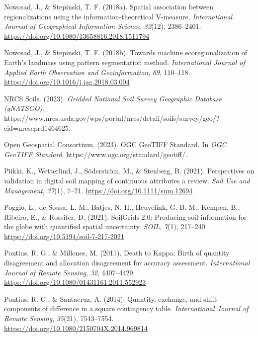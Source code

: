 \documentclass[
  letterpaper,
  DIV=11,
  numbers=noendperiod]{scrartcl}
\newlength{\cslhangindent}
\newlength{\cslentryspacingunit} %
\newenvironment{CSLReferences}[2] %
 {%
  \setlength{\parindent}{0pt}
  \ifodd #1
  \let\oldpar\par
  \def\par{\hangindent=\cslhangindent\oldpar}
  \fi
  \setlength{\parskip}{#2\cslentryspacingunit}
 }%
 {}
\begin{document}
\begin{CSLReferences}{1}{0}
\leavevmode{}%
Nowosad, J., \& Stepinski, T. F. (2018a). Spatial association between
regionalizations using the information-theoretical {V-measure}.
\emph{International Journal of Geographical Information Science},
\emph{32}(12), 2386--2401.
\url{https://doi.org/10.1080/13658816.2018.1511794}

\leavevmode{}%
Nowosad, J., \& Stepinski, T. F. (2018b). Towards machine
ecoregionalization of {Earth}'s landmass using pattern segmentation
method. \emph{International Journal of Applied Earth Observation and
Geoinformation}, \emph{69}, 110--118.
\url{https://doi.org/10.1016/j.jag.2018.03.004}

\leavevmode{}%
NRCS Soils. (2023). \emph{Gridded {National Soil Survey Geographic
Database} ({gNATSGO})}.
https://www.nrcs.usda.gov/wps/portal/nrcs/detail/soils/survey/geo/?cid=nrcseprd1464625.

\leavevmode{}%
Open Geospatial Consortium. (2023). {OGC GeoTIFF Standard}. In \emph{OGC
GeoTIFF Standard}. https://www.ogc.org/standard/geotiff/.

\leavevmode{}%
Piikki, K., Wetterlind, J., Söderström, M., \& Stenberg, B. (2021).
Perspectives on validation in digital soil mapping of continuous
attributes \textendash{} a review. \emph{Soil Use and Management},
\emph{37}(1), 7--21. \url{https://doi.org/10.1111/sum.12694}

\leavevmode{}%
Poggio, L., de Sousa, L. M., Batjes, N. H., Heuvelink, G. B. M., Kempen,
B., Ribeiro, E., \& Rossiter, D. (2021). {SoilGrids} 2.0: Producing soil
information for the globe with quantified spatial uncertainty.
\emph{SOIL}, \emph{7}(1), 217--240.
\url{https://doi.org/10.5194/soil-7-217-2021}

\leavevmode{}%
Pontius, R. G., \& Millones, M. (2011). Death to {Kappa}: Birth of
quantity disagreement and allocation disagreement for accuracy
assessment. \emph{International Journal of Remote Sensing}, \emph{32},
4407--4429. \url{https://doi.org/10.1080/01431161.2011.552923}

\leavevmode{}%
Pontius, R. G., \& Santacruz, A. (2014). Quantity, exchange, and shift
components of difference in a square contingency table.
\emph{International Journal of Remote Sensing}, \emph{35}(21),
7543--7554. \url{https://doi.org/10.1080/2150704X.2014.969814}


\end{CSLReferences}
\end{document}
